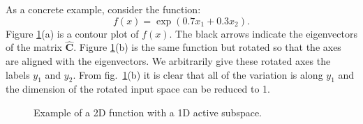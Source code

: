 As a concrete example, consider the function:~\cite{constantine2015active}
$$f(x) = \exp\left(0.7x_1 + 0.3x_2\right).$$
Figure \ref{fig:activesubspace}(a) is a contour plot of $f(x)$. The black arrows indicate the
eigenvectors of the matrix $\hat{\mathbf{C}}$. Figure \ref{fig:activesubspace}(b) is the same 
function but rotated so that the axes are aligned with the eigenvectors. We arbitrarily
give these rotated axes the labels $y_1$ and $y_2$. From fig.~\ref{fig:activesubspace}(b) it is
clear that all of the variation is along $y_1$ and the dimension of the rotated
input space can be reduced to 1.

\begin{figure}[htbp]
  \begin{subfigmatrix}{2}
  \end{subfigmatrix}
  \caption{Example of a 2D function with a 1D active subspace.}
\label{fig:activesubspace}
\end{figure}

